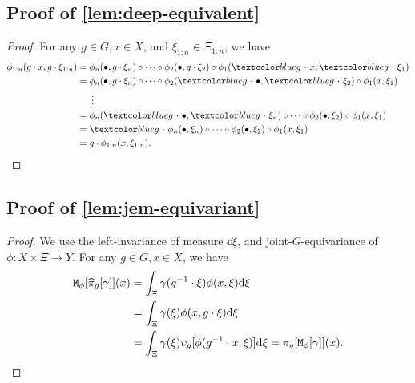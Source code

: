 \subsection{{Proof of \cref{lem:deep-equivalent}}} \label{sec:proof.deep-equivalent}
\begin{proof}
For any $g \in G, x \in X$, and $\xi_{1:n} \in \Xi_{1:n}$, we have
\begin{align*}
    \phi_{1:n}(g\cdot x, g\cdot\xi_{1:n})
    &= \phi_n(\bullet,g\cdot\xi_n) \circ \cdots \circ \phi_2(\bullet,g\cdot\xi_2)\circ \phi_1(\blue{g\wdot} x, \blue{g\wdot}\xi_1)\\
    &= \phi_n(\bullet,g\cdot\xi_n) \circ \cdots \circ \phi_2(\blue{g \wdot} \bullet,\blue{g\wdot}\xi_2)\circ \phi_1(x,\xi_1)\\
    &\phantom{==} \vdots\\
    &= \phi_n(\blue{g \wdot} \bullet,\blue{g\wdot}\xi_n) \circ \cdots \circ \phi_2(\bullet,\xi_2)\circ \phi_1(x,\xi_1)\\
    &= \blue{g \wdot} \phi_n(\bullet,\xi_n) \circ \cdots \circ \phi_2(\bullet,\xi_2)\circ \phi_1(x,\xi_1)\\
    &= g \cdot \phi_{1:n}(x, \xi_{1:n}). \qedhere
\end{align*}
\end{proof}

\subsection{{Proof of \cref{lem:jem-equivariant}}} \label{sec:proof.jem-equivariant}
\begin{proof}
We use the 
left-invariance of measure $\dd \xi$, and joint-$G$-equivariance of $\phi : X \times \Xi \to Y$. For any $g \in G, x \in X$, we have
\begin{align*}
\mathtt{M}_\phi[ \widehat{\pi}_g[\gamma]](x)
&= \int_\Xi \gamma(g^{-1} \cdot \xi) \phi(x,\xi) \mathrm{d} \xi\\
&= \int_\Xi \gamma(\xi) \phi(x,g\cdot\xi) \mathrm{d} \xi\\
&= \int_\Xi \gamma(\xi) \upsilon_g[\phi(g^{-1} \cdot x, \xi)] \mathrm{d} \xi
= \pi_g[ \mathtt{M}_\phi[\gamma]](x). \qedhere
\end{align*}
\end{proof}

